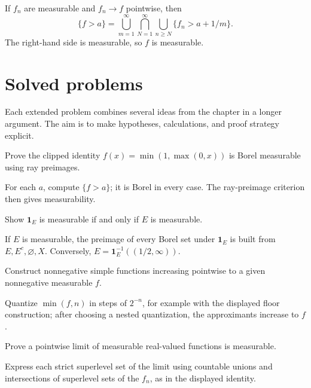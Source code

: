 \begin{example}\label{ex:iii02-worked-04}
If \(f_n\) are measurable and \(f_n\to f\) pointwise, then
\[
\{f>a\}=\bigcup_{m=1}^\infty\bigcap_{N=1}^\infty
\bigcup_{n\ge N}\{f_n>a+1/m\}.
\]
The right-hand side is measurable, so \(f\) is measurable.
\end{example}

\section{Solved problems}
Each extended problem combines several ideas from the chapter in a longer argument. The aim is to make hypotheses, calculations, and proof strategy explicit.

\begin{problem}\label{prob:iii02-problem-01}
Prove the clipped identity \(f(x)=\min(1,\max(0,x))\) is Borel measurable using ray preimages.
\end{problem}
\begin{solution}
For each \(a\), compute \(\{f>a\}\); it is Borel in every case. The
ray-preimage criterion then gives measurability.
\end{solution}

\begin{problem}\label{prob:iii02-problem-02}
Show \(\mathbf1_E\) is measurable if and only if \(E\) is measurable.
\end{problem}
\begin{solution}
If \(E\) is measurable, the preimage of every Borel set under
\(\mathbf1_E\) is built from \(E,E^c,\varnothing,X\). Conversely,
\(E=\mathbf1_E^{-1}((1/2,\infty))\).
\end{solution}

\begin{problem}\label{prob:iii02-problem-03}
Construct nonnegative simple functions increasing pointwise to a given nonnegative measurable \(f\).
\end{problem}
\begin{solution}
Quantize \(\min(f,n)\) in steps of \(2^{-n}\), for example with the displayed
floor construction; after choosing a nested quantization, the approximants
increase to \(f\).
\end{solution}

\begin{problem}\label{prob:iii02-problem-04}
Prove a pointwise limit of measurable real-valued functions is measurable.
\end{problem}
\begin{solution}
Express each strict superlevel set of the limit using countable unions and
intersections of superlevel sets of the \(f_n\), as in the displayed identity.
\end{solution}

